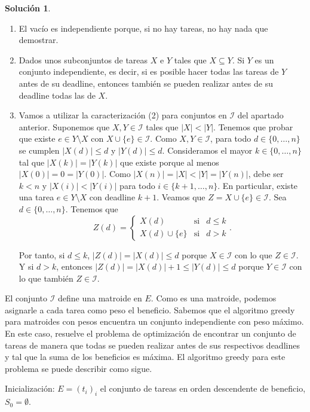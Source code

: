 \documentclass[10pt]{article}
\theoremstyle{definition}
\newtheorem*{sol}{Solución}
\begin{document}
\begin{sol}
\begin{enumerate}[labelindent=\parindent, label=(\alph*), ref=\alph*]
\begin{enumerate}[label=(I\arabic*)]
\item  El vacío es independiente porque, si no hay tareas, no hay nada que demostrar.
\item Dados unos subconjuntos de tareas $X$ e $Y$ tales que $X\subseteq Y$. Si $Y$ es un conjunto independiente, es decir, si es posible hacer todas las tareas de $Y$ antes de su deadline, entonces también se pueden realizar antes de su deadline todas las de $X$.
\item Vamos a utilizar la caracterización (2) para conjuntos en $\mathcal{I}$ del apartado anterior. Suponemos que $X,Y\in\mathcal{I}$ tales que $|X|<|Y|$. Tenemos que probar que existe $e\in Y\setminus X$ con $X\cup\{e\}\in\mathcal{I}$. Como $X,Y\in\mathcal{I}$, para todo $d\in \{0,\ldots,n\}$ se cumplen $|X(d)|\leq d$ y $|Y(d)|\leq d$. Consideramos el mayor $k\in\{0,\ldots, n\}$ tal que $|X(k)|=|Y(k)|$ que existe porque al menos $|X(0)|=0=|Y(0)|$. Como $|X(n)|=|X|<|Y|=|Y(n)|$, debe ser $k<n$ y $|X(i)|<|Y(i)|$ para todo $i\in\{k+1,\ldots, n\}$. En particular, existe una tarea $e\in Y\setminus X$ con deadline $k+1$. Veamos que $Z=X\cup\{e\}\in\mathcal{I}$. Sea $d\in\{0,\ldots, n\}.$ Tenemos que 
$$Z(d) = \left\{\begin{array}{ccc}
X(d) & \text{si} & d\leq k\\
X(d)\cup\{e\} & \text{si} & d> k
\end{array}\right..$$

Por tanto, si $d\leq k$, $|Z(d)|=|X(d)|\leq d$ porque $X\in\mathcal{I}$ con lo que $Z\in\mathcal{I}$. Y si $d>k$, entonces $|Z(d)| = |X(d)|+1\leq |Y(d)|\leq d$ porque $Y\in\mathcal{I}$ con lo que también $Z\in\mathcal{I}$.
\end{enumerate}
El conjunto $\mathcal{I}$ define una matroide en $E$. Como es una matroide, podemos asignarle a cada tarea como peso el beneficio. Sabemos que el algoritmo greedy para matroides con pesos encuentra un conjunto independiente con peso máximo. En este caso, resuelve el problema de optimización de encontrar un conjunto de tareas de manera que todas se pueden realizar antes de sus respectivos deadlines y tal que la suma de los beneficios es máxima. El algoritmo greedy para este problema se puede describir como sigue.

\begin{algorithm}[H]
\SetAlgoLined\DontPrintSemicolon
{}
 Inicialización: $E=(t_i)_i$ el conjunto de tareas en orden descendente de beneficio, $S_0=\emptyset$.\;
\end{algorithm}
\end{enumerate}
\end{sol}
\end{document}
